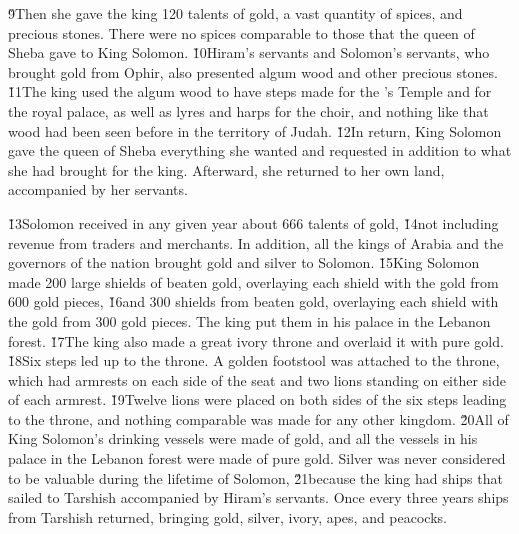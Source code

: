 \v{9}Then she gave the king 120 talents of gold, a vast quantity of spices, and precious stones. There were no spices comparable to those that the queen of Sheba gave to King Solomon. \v{10}Hiram's servants and Solomon's servants, who brought gold from Ophir, also presented algum wood and other precious stones. \v{11}The king used the algum wood to have steps made for the 's Temple and for the royal palace, as well as lyres and harps for the choir, and nothing like that wood had been seen before in the territory of Judah. \v{12}In return, King Solomon gave the queen of Sheba everything she wanted and requested in addition to what she had brought for the king. Afterward, she returned to her own land, accompanied by her servants.

\v{13}Solomon received in any given year about 666 talents of gold, \v{14}not including revenue from traders and merchants. In addition, all the kings of Arabia and the governors of the nation brought gold and silver to Solomon. \v{15}King Solomon made 200 large shields of beaten gold, overlaying each shield with the gold from 600 gold pieces, \v{16}and 300 shields from beaten gold, overlaying each shield with the gold from 300 gold pieces. The king put them in his palace in the Lebanon forest. \v{17}The king also made a great ivory throne and overlaid it with pure gold. \v{18}Six steps led up to the throne. A golden footstool was attached to the throne, which had armrests on each side of the seat and two lions standing on either side of each armrest. \v{19}Twelve lions were placed on both sides of the six steps leading to the throne, and nothing comparable was made for any other kingdom. \v{20}All of King Solomon's drinking vessels were made of gold, and all the vessels in his palace in the Lebanon forest were made of pure gold. Silver was never considered to be valuable during the lifetime of Solomon, \v{21}because the king had ships that sailed to Tarshish accompanied by Hiram's servants. Once every three years ships from Tarshish returned, bringing gold, silver, ivory, apes, and peacocks.

